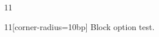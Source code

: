 \documentclass[paper=A4]{ropas-poster}
\begin{document}
\begin{postergrid}{1}{1}
\begin{posterblock}{1}{1}[corner-radius=10bp]
Block option test.
\end{posterblock}
\end{postergrid}
\end{document}
